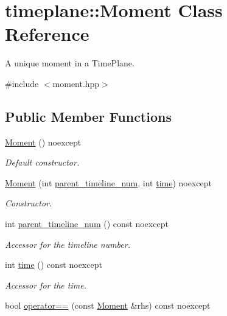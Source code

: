 \hypertarget{classtimeplane_1_1_moment}{}\section{timeplane\+:\+:Moment Class Reference}
\label{classtimeplane_1_1_moment}


A unique moment in a {\ttfamily Time\+Plane}.  




{\ttfamily \#include $<$moment.\+hpp$>$}

\subsection*{Public Member Functions}
\begin{DoxyCompactItemize}
\item 
\hyperlink{classtimeplane_1_1_moment_a5eecc085ee6010fa5079ddea4e79d6cb}{Moment} () noexcept
\begin{DoxyCompactList}\small\item\em Default constructor. \end{DoxyCompactList}\item 
\hyperlink{classtimeplane_1_1_moment_a33106530bbe889016479d1443d592571}{Moment} (int \hyperlink{classtimeplane_1_1_moment_ad8ea04fc7e079694a0843ff7b3f42c6c}{parent\+\_\+timeline\+\_\+num}, int \hyperlink{classtimeplane_1_1_moment_a118be8757aa459d4d6e4d859a5164251}{time}) noexcept
\begin{DoxyCompactList}\small\item\em Constructor. \end{DoxyCompactList}\item 
int \hyperlink{classtimeplane_1_1_moment_ad8ea04fc7e079694a0843ff7b3f42c6c}{parent\+\_\+timeline\+\_\+num} () const noexcept
\begin{DoxyCompactList}\small\item\em Accessor for the timeline number. \end{DoxyCompactList}\item 
int \hyperlink{classtimeplane_1_1_moment_a118be8757aa459d4d6e4d859a5164251}{time} () const noexcept
\begin{DoxyCompactList}\small\item\em Accessor for the time. \end{DoxyCompactList}\item 
bool \hyperlink{classtimeplane_1_1_moment_abe69bf9b6e324f3147c9f1ed078b9d0c}{operator==} (const \hyperlink{classtimeplane_1_1_moment}{Moment} \&rhs) const noexcept

\end{DoxyCompactItemize}
